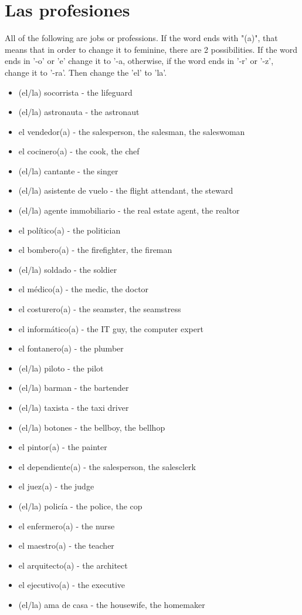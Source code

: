\documentclass[12pt]{article}
\begin{document}
    \section{Las profesiones}
        All of the following are jobs or professions. If the word ends with "(a)", that means that
        in order to change it to feminine, there are 2 possibilities. If the word ends in '-o' or 'e'
        change it to '-a, otherwise, if the word ends in '-r' or '-z', change it to '-ra'. Then change the 'el' to 'la'.
        \begin{itemize}
            \item (el/la) socorrista - the lifeguard
            \item (el/la) astronauta - the astronaut
            \item el vendedor(a) - the salesperson, the salesman, the saleswoman
            \item el cocinero(a) - the cook, the chef
            \item (el/la) cantante - the singer
            \item (el/la) asistente de vuelo - the flight attendant, the steward
            \item (el/la) agente immobiliario - the real estate agent, the realtor
            \item el político(a) - the politician
            \item el bombero(a) - the firefighter, the fireman
            \item (el/la) soldado - the soldier
            \item el médico(a) - the medic, the doctor
            \item el costurero(a) - the seamster, the seamstress
            \item el informático(a) - the IT guy, the computer expert
            \item el fontanero(a) - the plumber
            \item (el/la) piloto - the pilot
            \item (el/la) barman - the bartender
            \item (el/la) taxista - the taxi driver
            \item (el/la) botones - the bellboy, the bellhop
            \item el pintor(a) - the painter
            \item el dependiente(a) - the salesperson, the salesclerk
            \item el juez(a) - the judge
            \item (el/la) policía - the police, the cop
            \item el enfermero(a) - the nurse
            \item el maestro(a) - the teacher
            \item el arquitecto(a) - the architect
            \item el ejecutivo(a) - the executive
            \item (el/la) ama de casa - the housewife, the homemaker
        \end{itemize}
\end{document}
